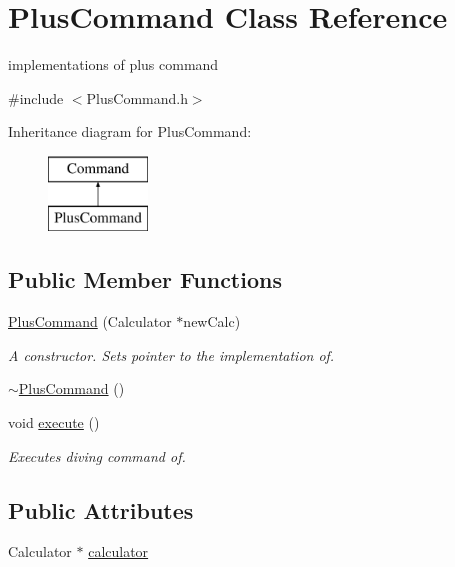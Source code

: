 \hypertarget{class_plus_command}{}\section{Plus\+Command Class Reference}
\label{class_plus_command}


implementations of plus command  




{\ttfamily \#include $<$Plus\+Command.\+h$>$}

Inheritance diagram for Plus\+Command\+:\begin{figure}[H]
\begin{center}
\leavevmode
\includegraphics[height=2.000000cm]{class_plus_command}
\end{center}
\end{figure}
\subsection*{Public Member Functions}
\begin{DoxyCompactItemize}
\item 
\hyperlink{class_plus_command_a687cab12cc701d06dcf998c42c30bc31}{Plus\+Command} (Calculator $\ast$new\+Calc)
\begin{DoxyCompactList}\small\item\em A constructor. Sets pointer to the implementation of. \end{DoxyCompactList}\item 
\hyperlink{class_plus_command_afb3c95c00492242972f1fc4ca80ca43f}{$\sim$\+Plus\+Command} ()
\item 
void \hyperlink{class_plus_command_a43c95e8e8ac4260f507f92d9d40f0699}{execute} ()
\begin{DoxyCompactList}\small\item\em Executes diving command of. \end{DoxyCompactList}\end{DoxyCompactItemize}
\subsection*{Public Attributes}
\begin{DoxyCompactItemize}
\item 
Calculator $\ast$ \hyperlink{class_plus_command_a6dd3da59e837ac5bcd1063ecc5895f0e}{calculator}
\end{DoxyCompactItemize}


